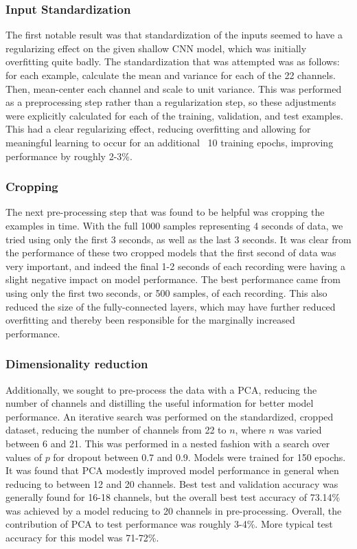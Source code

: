 \documentclass[10pt,twocolumn,letterpaper]{article}
\begin{document}
\subsubsection{Input Standardization}
The first notable result was that standardization of the inputs seemed to have a
regularizing effect on the given shallow CNN model, which was initially
overfitting quite badly. The standardization that was attempted was as follows:
for each example, calculate the mean and variance for each of the 22 channels. 
Then, mean-center each channel and scale to unit variance. This was performed as
a preprocessing step rather than a regularization step, so these adjustments
were explicitly calculated for each of the training, validation, and test
examples. This had a clear regularizing effect, reducing overfitting and
allowing for meaningful learning to occur for an additional ~10 training epochs,
improving performance by roughly 2-3\%.

\subsubsection{Cropping}
The next pre-processing step that was found to be helpful was cropping the
examples in time. With the full 1000 samples representing 4 seconds of data, we
tried using only the first 3 seconds, as well as the last 3 seconds. It was
clear from the performance of these two cropped models that the first second of
data was very important, and indeed the final 1-2 seconds of each recording were
having a slight negative impact on model performance. The best performance came
from using only the first two seconds, or 500 samples, of each recording. This
also reduced the size of the fully-connected layers, which may have further
reduced overfitting and thereby been responsible for the marginally increased
performance.

\subsubsection{Dimensionality reduction}
Additionally, we sought to pre-process the data with a PCA, reducing the number
of channels and distilling the useful information for better model performance.
An iterative search was performed on the standardized, cropped dataset,
reducing the number of channels from 22 to $n$, where $n$ was varied between 6
and 21. 
This was performed in a nested fashion with a search over values of $p$ for
dropout between 0.7 and 0.9. Models were trained for 150 epochs. It was found
that PCA modestly improved model performance in general when reducing to
between 12 and 20 channels. Best test and validation accuracy was generally
found for 16-18 channels, but the overall best test accuracy of 73.14\% was
achieved by a model reducing to 20 channels in pre-processing. 
Overall, the contribution of PCA to test performance was roughly 3-4\%.
More typical test accuracy for this model was 71-72\%.
\end{document}
